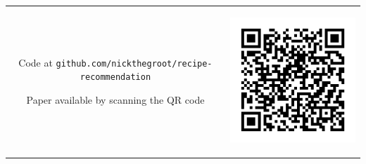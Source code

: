 \documentclass[landscape,a0b,final,a4resizeable]{a0poster}
\newenvironment{poster}{
  \begin{center}
  \begin{minipage}[c]{0.96\textwidth}
}{
  \end{minipage} 
  \end{center}
}
\theoremstyle{definition}
\theoremstyle{remark}
\begin{document}
\begin{poster}
\begin{multicols}{3}
\begin{tabular}{cc}
\begin{minipage}[c]{0.8\columnwidth}
        Code at \texttt{github.com/nickthegroot/recipe-recommendation}

        Paper available by scanning the QR code

      \end{minipage}
       &
      \begin{minipage}[c]{0.2\columnwidth}
        \begin{centering}
          \includegraphics[width=\linewidth]{figures/report_qr.png}
        \end{centering}
      \end{minipage}
    \end{tabular}

  \end{multicols}

\end{poster}
\end{document}
